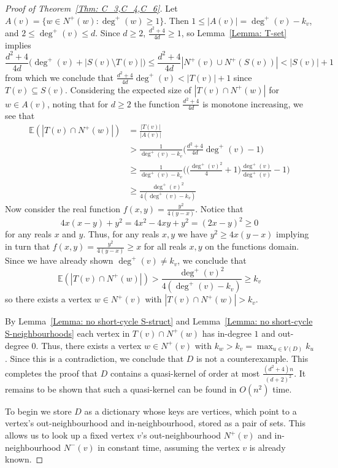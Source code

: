 \documentclass[12pt]{article}
\theoremstyle{definition}
\begin{document}
\begin{proof}[Proof of Theorem~\ref{Thm: C_3,C_4,C_6}]
    Let $A(v) = \{w\in N^+(w): \deg^+(w)\geq 1\}$.
    Then $1\leq |A(v)| = \deg^+(v)-k_v$, and $2\leq \deg^+(v) \leq d$.
    Since $d\geq 2$, $\frac{d^2+4}{4d} \geq 1$,
    so Lemma~\ref{Lemma: T-set} implies
    \[
    \frac{d^2+4}{4d}\Big(\deg^+(v)+|S(v)\setminus T(v)| \Big) \leq \frac{d^2+4}{4d}|N^+(v) \cup N^+(S(v))| < |S(v)|+1
    \]
    from which we conclude that $\frac{d^2+4}{4d}\deg^+(v) < |T(v)|+1$ since $T(v) \subseteq S(v)$.
    Considering the expected size of $|T(v)\cap N^+(w)|$ for $w \in A(v)$,
    noting that for $d\geq 2$ the function $\frac{d^2+4}{4d}$ is monotone increasing,
    we see that
    \begin{align*}
        \mathbb{E}(|T(v)\cap N^+(w)|) &= \frac{|T(v)|}{|A(v)|} \\
        & > \frac{1}{\deg^+(v)-k_v}\Bigg(\frac{d^2+4}{4d}\deg^+(v) - 1\Bigg) \\
        & \geq \frac{1}{\deg^+(v)-k_v}\Bigg(\Big(\frac{\deg^+(v)^2}{4}+1 \Big)\frac{\deg^+(v)}{\deg^+(v)}  - 1\Bigg) \\
        & \geq \frac{\deg^+(v)^2}{4(\deg^+(v)-k_v)}
    \end{align*}
    Now consider the real function $f(x,y) = \frac{y^2}{4(y-x)}$.
    Notice that 
    \[
    4x(x-y) + y^2 = 4x^2-4xy+y^2 = (2x-y)^2\geq 0
    \]
    for any reals $x$ and $y$. Thus, for any reals $x,y$
    we have $y^2 \geq 4x(y-x)$ implying in turn that
    $f(x,y) = \frac{y^2}{4(y-x)} \geq x$ for all reals $x,y$ on the functions domain.
    Since we have already shown $\deg^+(v)\neq k_v$, we conclude that
    \[
     \mathbb{E}(|T(v)\cap N^+(w)|) > \frac{\deg^+(v)^2}{4(\deg^+(v)-k_v)} \geq k_v
    \]
    so there exists a vertex $w \in N^+(v)$ with $|T(v)\cap N^+(w)| > k_v$.
    
    By Lemma~\ref{Lemma: no short-cycle S-struct} and Lemma~\ref{Lemma: no short-cycle S-neighbourhoods}
    each vertex in $T(v)\cap N^+(w)$ has in-degree $1$ and out-degree $0$.
    Thus, there exists a vertex $w \in N^+(v)$ with $k_w > k_v = \max_{u\in V(D)} k_u$.
    Since this is a contradiction, we conclude that $D$ is not a counterexample.
    This completes the proof that $D$ contains a quasi-kernel of order at most $\frac{(d^2+4)n}{(d+2)^2}$.
    It remains to be shown that 
    such a quasi-kernel can be found in $O(n^2)$ time.

    To begin we store $D$ as a dictionary whose keys are vertices, which point to a vertex's out-neighbourhood and in-neighbourhood, 
    stored as a pair of sets.
    This allows us to look up a fixed vertex $v$'s out-neighbourhood $N^+(v)$ and in-neighbourhood $N^-(v)$ in constant time,
    assuming the vertex $v$ is already known.
    

\end{proof}
\end{document}

